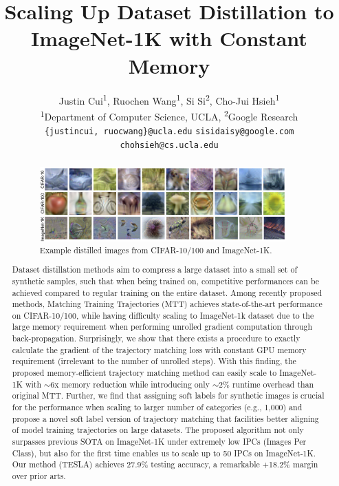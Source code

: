 \documentclass[10pt,twocolumn,letterpaper]{article}
\begin{document}
\title{Scaling Up Dataset Distillation to ImageNet-1K with Constant Memory}

\author{%
\small{Justin Cui\textsuperscript{1},
\enskip Ruochen Wang\textsuperscript{1},
\enskip Si Si\textsuperscript{2},
\enskip Cho-Jui Hsieh\textsuperscript{1}}\\
\textsuperscript{1}{Department of Computer Science, UCLA, \enskip \textsuperscript{2}Google Research}\\
\small{\texttt{\{justincui, ruocwang\}@ucla.edu}} 
\quad \small{\texttt{sisidaisy@google.com}}
\quad \small{\texttt{chohsieh@cs.ucla.edu}}\\
}
\maketitle

\begin{abstract}
\begin{figure}
    \centering
    \includegraphics[width=0.95\textwidth]{images/sample_images.png}
    \caption{Example distilled images from CIFAR-10/100 and ImageNet-1K.}
    \label{fig:sample_iamges}
\end{figure}
Dataset distillation methods aim to compress a large  dataset into a small set of synthetic samples, such that when being trained on, competitive performances can be achieved compared to regular training on the entire dataset. Among recently proposed methods, Matching Training Trajectories (MTT) achieves state-of-the-art performance on CIFAR-10/100, while having difficulty scaling to ImageNet-1k dataset due to the large memory requirement when performing unrolled gradient computation through back-propagation. Surprisingly, we show that there exists a procedure to exactly calculate the gradient of the trajectory matching loss  with constant GPU memory requirement (irrelevant to the number of unrolled steps). With this finding, the proposed memory-efficient trajectory matching method can easily scale to ImageNet-1K with $\sim 6$x memory reduction while introducing only $\sim 2$\% runtime overhead than original MTT. Further, we find that assigning soft labels for synthetic images is crucial for the performance when scaling to larger number of categories (e.g., 1,000) and propose a novel soft label version of trajectory matching that facilities better aligning of model training trajectories on large datasets. 
The proposed algorithm not only surpasses previous SOTA on ImageNet-1K under extremely low IPCs (Images Per Class), but also for the first time enables us to scale up to 50 IPCs on ImageNet-1K.
Our method (TESLA) achieves 27.9\% testing accuracy, a remarkable +18.2\% margin over prior arts.
\end{abstract}
\end{document}
